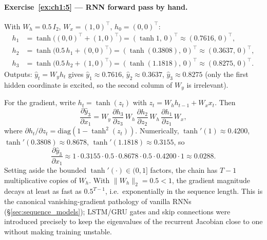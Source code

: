\documentclass[11pt,a4paper]{report}
\begin{document}
\paragraph{Exercise~\ref{ex:ch1:5} --- RNN forward pass by hand.}
With $W_h = 0.5\,I_2$, $W_x = (1,0)^\top$, $h_0 = (0,0)^\top$:
\begin{align*}
h_1 &= \tanh\!\big((0,0)^\top + (1,0)^\top\big) = (\tanh 1,\, 0)^\top \approx (0.7616,\, 0)^\top,\\
h_2 &= \tanh\!\big(0.5\,h_1 + (0,0)^\top\big) = (\tanh(0.3808),\,0)^\top \approx (0.3637,\,0)^\top,\\
h_3 &= \tanh\!\big(0.5\,h_2 + (1,0)^\top\big) = (\tanh(1.1818),\,0)^\top \approx (0.8275,\,0)^\top.
\end{align*}
Outputs: $\hat y_t = W_y h_t$ gives $\hat y_1 \approx 0.7616$, $\hat y_2 \approx 0.3637$, $\hat y_3 \approx 0.8275$ (only the first hidden coordinate is excited, so the second column of $W_y$ is irrelevant).

For the gradient, write $h_t = \tanh(z_t)$ with $z_t = W_h h_{t-1} + W_x x_t$.  Then
\[
\frac{\partial \hat y_3}{\partial x_1} = W_y\,\frac{\partial h_3}{\partial z_3}\,W_h\,\frac{\partial h_2}{\partial z_2}\,W_h\,\frac{\partial h_1}{\partial z_1}\,W_x,
\]
where $\partial h_t/\partial z_t = \mathrm{diag}(1-\tanh^2(z_t))$.  Numerically, $\tanh'(1)\approx 0.4200$, $\tanh'(0.3808)\approx 0.8678$, $\tanh'(1.1818)\approx 0.3155$, so
\[
\frac{\partial \hat y_3}{\partial x_1} \approx 1 \cdot 0.3155 \cdot 0.5 \cdot 0.8678 \cdot 0.5 \cdot 0.4200 \cdot 1 \approx 0.0288.
\]
Setting aside the bounded $\tanh'(\cdot) \in (0,1]$ factors, the chain has $T-1$ multiplicative copies of $W_h$.  With $\|W_h\|_2 = 0.5 < 1$, the gradient magnitude decays at least as fast as $0.5^{T-1}$, i.e.\ exponentially in the sequence length.  This is the canonical vanishing-gradient pathology of vanilla RNNs (\S\ref{sec:sequence_models}); LSTM/GRU gates and skip connections were introduced precisely to keep the eigenvalues of the recurrent Jacobian close to one without making training unstable.
\end{document}
